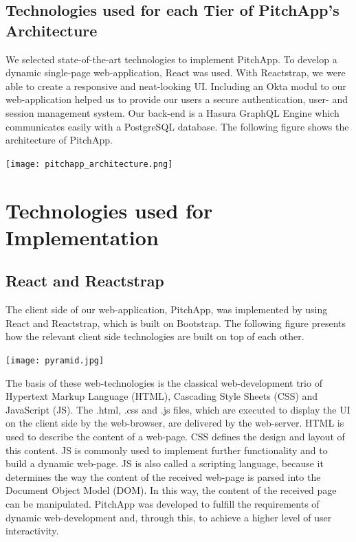 \break

\section{Technologies used for each Tier of PitchApp's Architecture}

We selected state-of-the-art technologies to implement PitchApp. To develop a dynamic single-page web-application, React was used. With Reactstrap, we were able to create a responsive and neat-looking UI. Including an Okta modul to our web-application helped us to provide our users a secure authentication, user- and session management system. Our back-end is a Hasura GraphQL Engine which communicates easily with a PostgreSQL database. The following figure shows the architecture of PitchApp.

\begin{center}
	\texttt{[image: pitchapp\_architecture.png]}
\end{center}


\chapter{Technologies used for Implementation}
\section{React and Reactstrap}

The client side of our web-application, PitchApp, was implemented by using React and Reactstrap, which is built on Bootstrap. The following figure presents how the relevant client side technologies are built on top of each other.

\begin{center}
	\texttt{[image: pyramid.jpg]}
\end{center}  

The basis of these web-technologies is the classical web-development trio of Hypertext Markup Language (HTML), Cascading Style Sheets (CSS) and JavaScript (JS). The .html, .css and .js files, which are executed to display the UI on the client side by the web-browser, are delivered by the web-server. HTML is used to describe the content of a web-page. CSS defines the design and layout of this content. JS is commonly used to implement further functionality and to build a dynamic web-page. JS is also called a scripting language, because it determines the way the content of the received web-page is parsed into the Document Object Model (DOM). In this way, the content of the received page can be manipulated. PitchApp was developed to fulfill the requirements of dynamic web-development and, through this, to achieve a higher level of user interactivity.

